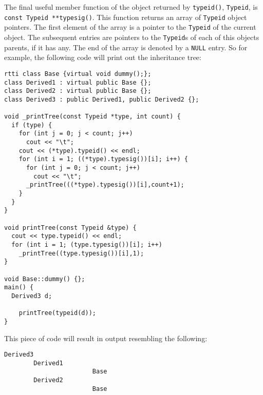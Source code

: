 The final useful member function of the object returned by {\tt typeid()},
{\tt Typeid}, is {\tt const Typeid **typesig()}. This function returns an 
array of {\tt Typeid} object pointers. The first element of the array is a 
pointer to the {\tt Typeid} of the current object. The subsequent entries
are pointers to the {\tt Typeid}s of each of this objects parents, if it has
any. The end of the array is denoted by a {\tt NULL} entry. So for 
example, the following code will print out the inheritance tree:
\begin{verbatim}
rtti class Base {virtual void dummy();};
class Derived1 : virtual public Base {};
class Derived2 : virtual public Base {};
class Derived3 : public Derived1, public Derived2 {};

void _printTree(const Typeid *type, int count) {
  if (type) {
    for (int j = 0; j < count; j++)
      cout << "\t";
    cout << (*type).typeid() << endl;
    for (int i = 1; ((*type).typesig())[i]; i++) {
      for (int j = 0; j < count; j++)
        cout << "\t";
      _printTree(((*type).typesig())[i],count+1);
    }
  }
}

void printTree(const Typeid &type) {
  cout << type.typeid() << endl;
  for (int i = 1; (type.typesig())[i]; i++)
    _printTree((type.typesig())[i],1);
}

void Base::dummy() {};
main() {
  Derived3 d;

    printTree(typeid(d));
}
\end{verbatim}
\noindent
This piece of code will result in output resembling the following:
\begin{verbatim}
Derived3
        Derived1
                        Base
        Derived2
                        Base
\end{verbatim}
